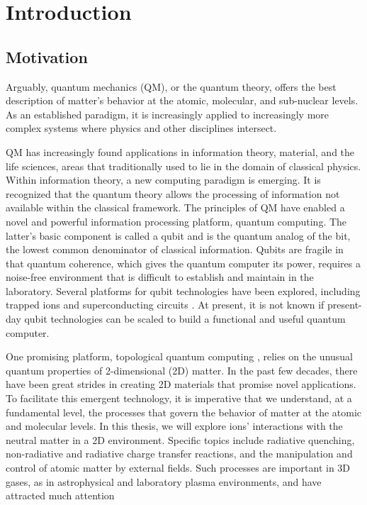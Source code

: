 \selectfont
\setcounter{chapter}{0}
\chapter{Introduction}

\label{introduction}
 
\section{Motivation}
Arguably, quantum mechanics (QM), or the quantum theory, offers the best description of matter's behavior at the atomic, molecular, and sub-nuclear levels. As an established paradigm, it is increasingly applied to increasingly more complex systems where physics and other disciplines intersect.

QM has increasingly found applications in information theory, material, and the life sciences, areas that traditionally used to lie in the domain of classical physics. Within information theory, a new computing paradigm is emerging. It is recognized that the quantum theory allows the processing of information \cite{QIP} not available within the classical framework.
The principles of QM have enabled a novel and powerful information processing platform, quantum computing. The latter's basic component is called a qubit \cite{qubits} and is the quantum analog of the bit, the lowest common denominator of classical information. Qubits are fragile in that quantum coherence, which gives the quantum computer its power, requires a noise-free environment that is difficult to establish and maintain in the laboratory. Several platforms for qubit technologies have been explored, including trapped ions and superconducting circuits \cite{qubits2}. At present, it is not known if present-day qubit technologies can be scaled to build a functional and useful quantum computer.

One promising platform, topological quantum computing \cite{Tqc1,Tqc2,Tqc3, Tqc4, Tqc5}, relies on the unusual quantum properties of 2-dimensional (2D) matter. In the past few decades, there have been great strides in creating 2D materials that promise novel applications.\cite{Nature2D}
To facilitate this emergent technology, it is imperative that we understand, at a fundamental level, the processes that govern the behavior of matter at the atomic and molecular levels. In this thesis, we will explore ions' interactions with the neutral matter in a 2D environment. Specific topics include radiative quenching, non-radiative and radiative charge transfer reactions, and the manipulation and control of atomic matter by external fields. Such processes are important in 3D gases, as in astrophysical and laboratory plasma environments, and have attracted much attention \cite{plasma}

